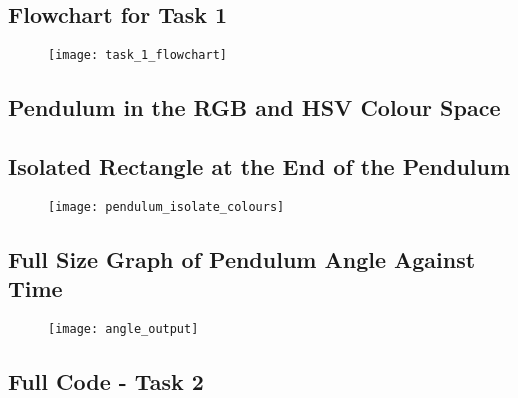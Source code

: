 \documentclass[conference]{IEEEtran}
\begin{document}
\begin{appendix}

\subsection{Flowchart for Task 1}

\begin{figure}[H]
\centerline{\texttt{[image: task\_1\_flowchart]}}
\end{figure}

\label{appendix:task_1_flowchart}

\subsection{Pendulum in the RGB and HSV Colour Space}

\begin{figure}[H]
\centering
{}
\end{figure}

\label{appendix:pendulum_rgb_hsv_space}

\subsection{Isolated Rectangle at the End of the Pendulum}

\begin{figure}[H]
\centerline{\texttt{[image: pendulum\_isolate\_colours]}}
\end{figure}

\label{appendix:isolated_rectangle}

\subsection{Full Size Graph of Pendulum Angle Against Time}

\begin{figure}[H]
\centerline{\texttt{[image: angle\_output]}}
\end{figure}

\label{appendix:angle_output_full_size}

\subsection{Full Code - Task 2 }


\end{appendix}
\end{document}
